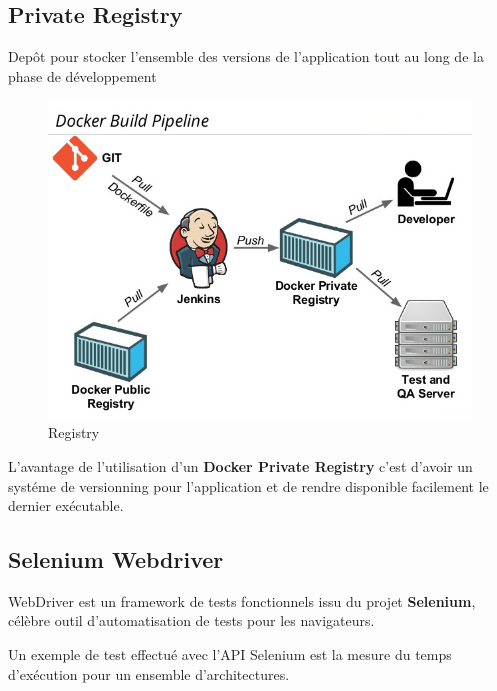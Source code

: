 \documentclass [a4paper,11pt]{article}
\begin{document}
\subsection{Private Registry}

Depôt pour stocker l'ensemble des versions de l'application tout au long de la phase de développement

\begin{figure}[H]
\centering
\includegraphics[scale=0.4]{img/registry.png}
\caption {Registry}
\end{figure}

L'avantage de l'utilisation d'un \textbf{Docker Private Registry} c'est d'avoir un systéme de versionning pour l'application et de rendre disponible facilement le dernier exécutable.

\subsection{Selenium Webdriver}
WebDriver est un framework de tests fonctionnels issu du projet \textbf{Selenium}, célèbre outil d'automatisation de tests pour les navigateurs.\newline

Un exemple de test effectué avec l'API Selenium est la mesure du temps d'exécution pour un ensemble d'architectures.
\end{document}
